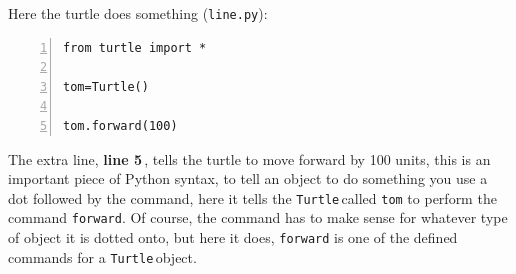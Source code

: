 \documentclass[11pt,a4paper]{scrartcl}
\newcommand{\turtle}{\texttt{Turtle}\,}
\newcommand{\lnn}[1]{\textbf{line #1}\,}
\begin{document}
Here the turtle does something (\texttt{line.py}):
\begin{lstlisting}[numbers=left]
from turtle import *

tom=Turtle()

tom.forward(100)
\end{lstlisting}
The extra line, \lnn{5}, tells the turtle to move forward by 100 units,
this is an important piece of Python syntax, to tell an object to do
something you use a dot followed by the command, here it tells the
\turtle called \texttt{tom} to perform the command
\texttt{forward}. Of course, the command has to make sense for
whatever type of object it is dotted onto, but here it does,
\texttt{forward} is one of the defined commands for a \turtle object.
\begin{center}
\end{center}
\end{document}
